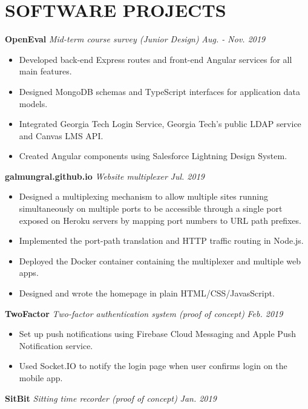 \documentclass[11pt]{article}
\begin{document}
\section*{SOFTWARE PROJECTS}
\textbf{OpenEval} \enspace \textit{\color{gray} Mid-term course survey (Junior Design)} \hfill \textit{Aug. - Nov. 2019}
\begin{itemize}[leftmargin=15pt, noitemsep, topsep=0pt]
\item Developed back-end Express routes and front-end Angular services for all main features.
\item Designed MongoDB schemas and TypeScript interfaces for application data models.
\item Integrated Georgia Tech Login Service, Georgia Tech's public LDAP service and Canvas LMS API.
\item Created Angular components using Salesforce Lightning Design System.
\end{itemize}
\vspace{0.5em}
%
\textbf{galmungral.github.io}  \enspace \textit{\color{gray} Website multiplexer} \hfill\textit{Jul. 2019}
\begin{itemize}[leftmargin=15pt, noitemsep, topsep=0pt]
\item Designed a multiplexing mechanism to allow multiple sites running simultaneously on multiple ports to be accessible through a single port exposed on Heroku servers by mapping port numbers to URL path prefixes.
\item Implemented the port-path translation and HTTP traffic routing in Node.js.
\item Deployed the Docker container containing the multiplexer and multiple web apps.
\item Designed and wrote the homepage in plain HTML/CSS/JavasScript.
\end{itemize}
\vspace{0.5em}
%
\textbf{TwoFactor} \enspace \textit{\color{gray} Two-factor authentication system (proof of concept)} \hfill \textit{Feb. 2019}
\begin{itemize}[leftmargin=15pt, noitemsep, topsep=0pt]
\item Set up push notifications using Firebase Cloud Messaging and Apple Push Notification service.
\item Used Socket.IO to notify the login page when user confirms login on the mobile app.
\end{itemize}
\vspace{0.5em}
%
\textbf{SitBit} \enspace \textit{\color{gray} Sitting time recorder (proof of concept)}  \hfill \textit{Jan. 2019}
\end{document}
